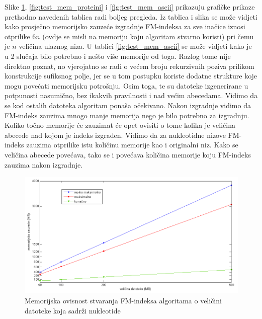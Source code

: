 Slike \ref{fig:test_mem_nukl}, \ref{fig:test_mem_proteini} i \ref{fig:test_mem_ascii} prikazuju grafičke prikaze prethodno navedenih tablica radi boljeg pregleda. Iz tablica i slika se može vidjeti kako prosječno memorijsko zauzeće izgradnje FM-indeksa za sve inačice iznosi otprilike $6n$ (ovdje se misli na memoriju koju algoritam stvarno koristi) pri čemu je $n$ veličina ulaznog niza. U tablici \ref{fig:test_mem_ascii} se može vidjeti kako je u 2 slučaja bilo potrebno i nešto više memorije od toga. Razlog tome nije direktno poznat, no vjerojatno se radi o većem broju rekurzivnih poziva prilikom konstrukcije sufiksnog polje, jer se u tom postupku koriste dodatne strukture koje mogu povećati memorijsku potrošnju. Osim toga, te su datoteke izgenerirane u potpunosti nasumično, bez ikakvih pravilnosti i nad većim abecedama. Vidimo da se kod ostalih datoteka algoritam ponaša očekivano. Nakon izgradnje vidimo da FM-indeks zauzima mnogo manje memorija nego je bilo potrebno za izgradnju. Koliko točno memorije će zauzimat će opet ovisiti o tome kolika je veličina abecede nad kojom je indeks izgrađen. Vidimo da za nukleotidne nizove FM-indeks zauzima otprilike istu količinu memorije kao i originalni niz. Kako se veličina abecede povećava, tako se i povećava količina memorije koju FM-indeks zauzima nakon izgradnje.


\begin{figure}[H]
   \centering
       \includegraphics[width=\textwidth]{./pictures/test_mem_nukl.png}
 \caption{Memorijska ovisnost stvaranja FM-indeksa algoritama o veličini datoteke koja sadrži nukleotide}
 \label{fig:test_mem_nukl}
\end{figure}

